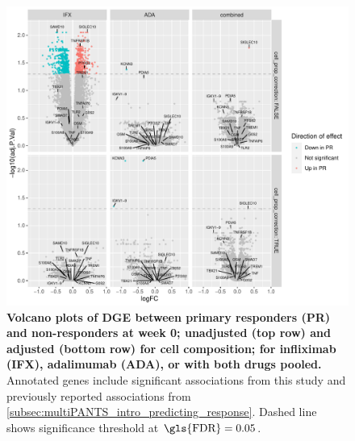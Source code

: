 \begin{figure}
    \centering
    \includegraphics[width=1.0\textwidth,page=1]{mainmatter/figures/chapter_04/plot_gene_set_enrichment.dge_result_volcano_simple_C_1RI_1NI,C_1RA_1NA,C_1R_1N.pdf}
    \caption[
    ]{
        \textbf{Volcano plots of \gls{DGE} between primary responders (PR) and non-responders at week 0; unadjusted (top row) and adjusted (bottom row) for cell composition; for infliximab (IFX), adalimumab (ADA), or with both drugs pooled.}
        Annotated genes include significant associations from this study and previously reported associations from \cref{subsec:multiPANTS_intro_predicting_response}.
        Dashed line shows significance threshold at $\text{\gls{FDR}} = 0.05$.
    }
    \label{fig:multipants_dge_volcano_week_0_R_N}
\end{figure}


